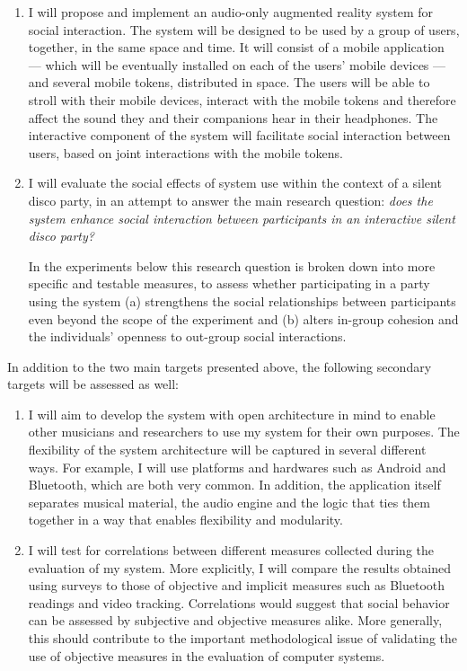 \documentclass[a4paper,11pt]{article}
\begin{document}
\begin{enumerate}[resume]
    \item I will propose and implement an audio-only augmented reality system for social interaction.
          The system will be designed to be used by a group of users, together, in the same space and time.
          It will consist of a mobile application --- which will be eventually installed on each of the users' mobile devices --- and several mobile tokens, distributed in space.
          The users will be able to stroll with their mobile devices, interact with the mobile tokens and therefore affect the sound they and their companions hear in their headphones.
          The interactive component of the system will facilitate social interaction between users, based on joint interactions with the mobile tokens.

    \item I will evaluate the social effects of system use within the context of a silent disco party, in an attempt to answer the main research question: \emph{does the system enhance social interaction between participants in an interactive silent disco party?}

          In the experiments below this research question is broken down into more specific and testable measures, to assess whether participating in a party using the system (a) strengthens the social relationships between participants even beyond the scope of the experiment and (b) alters in-group cohesion and the individuals' openness to out-group social interactions.
\end{enumerate}

In addition to the two main targets presented above, the following secondary targets will be assessed as well:

\begin{enumerate}[resume]
    \item I will aim to develop the system with open architecture in mind to enable other musicians and researchers to use my system for their own purposes.
          The flexibility of the system architecture will be captured in several different ways.
          For example, I will use platforms and hardwares such as Android and Bluetooth, which are both very common.
          In addition, the application itself separates musical material, the audio engine and the logic that ties them together in a way that enables flexibility and modularity.
    \item I will test for correlations between different measures collected during the evaluation of my system.
          More explicitly, I will compare the results obtained using surveys to those of objective and implicit measures such as Bluetooth readings and video tracking.
          Correlations would suggest that social behavior can be assessed by subjective and objective measures alike.
          More generally, this should contribute to the important methodological issue of validating the use of objective measures in the evaluation of computer systems.
\end{enumerate}
\end{document}
